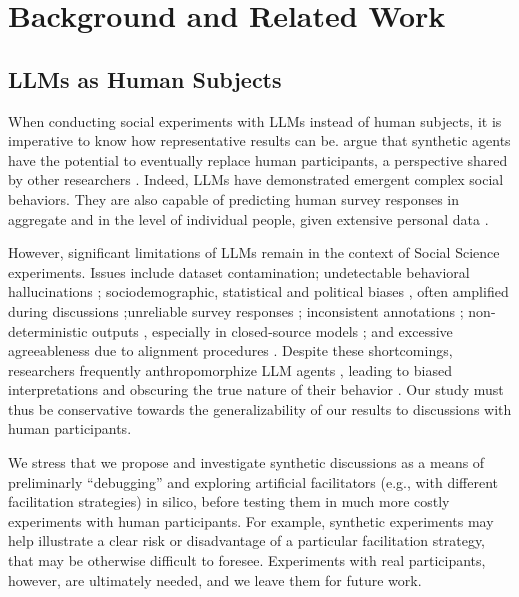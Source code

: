 %
\section{Background and Related Work}

\subsection{LLMs as Human Subjects}
\label{ssec:related:human-llm}

When conducting social experiments with \acp{LLM} instead of human subjects, it is imperative to know how representative results can be. \citet{grossman_2023} argue that synthetic agents have the potential to eventually replace human participants, a perspective shared by other researchers \cite{tornberg_2023, argyle2023}. Indeed, \acp{LLM} have demonstrated emergent complex social behaviors\cite{Park2023GenerativeAI, demarzo_2023, leng_2024, abdelnabi_negotiations, abramski_2023}. They are also capable of predicting human survey responses in aggregate \cite{hewitt2024predicting} and in the level of individual people, given extensive personal data \cite{park2024generativeagentsimulations1000}. %

However, significant limitations of \acp{LLM} remain in the context of Social Science experiments. Issues include dataset contamination; undetectable behavioral hallucinations \cite{rossi_2024}; sociodemographic, statistical and political biases \cite{anthis_2025,hewitt2024predicting,rossi_2024}, often amplified during discussions \cite{Taubenfeld2024SystematicBI};unreliable survey responses \cite{jansen_2023,bisbee_2023,neumann_2025}; inconsistent annotations \cite{Gligoric2024CanUL}; non-deterministic outputs \cite{atil_2025}, especially in closed-source models \cite{bisbee_2023}; and excessive agreeableness due to alignment procedures \cite{Park2023GenerativeAI, anthis_2025, rossi_2024}. Despite these shortcomings, researchers frequently anthropomorphize \ac{LLM} agents \cite{rossi_2024}, leading to biased interpretations and obscuring the true nature of their behavior \cite{anthis_2025,zhou-etal-2024-real}. Our study must thus be conservative towards the generalizability of our results to discussions with human participants.

We stress that we propose and investigate synthetic discussions as a means of preliminarly “debugging” and exploring artificial facilitators (e.g., with different facilitation strategies) in silico, before testing them in much more costly experiments with human participants. For example, synthetic experiments may help illustrate a clear risk or disadvantage of a particular facilitation strategy, that may be otherwise difficult to foresee. Experiments with real participants, however, are ultimately needed, and we leave them for future work.


